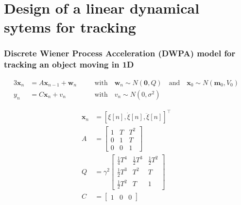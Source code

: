 \section{Design of a linear dynamical sytems for tracking}

\begin{frame}
    \frametitle{Discrete Wiener Process Acceleration (DWPA) model for tracking
    an object moving in 1D}

    \small

    \begin{alignat*}{3}
        \mathbf{x}_n &= A\mathbf{x}_{n-1} + \mathbf{w}_n && \quad \text{with} \quad\mathbf{w}_n\sim N(\mathbf{0}, Q) \quad \text{and} \quad\mathbf{x}_0\sim N(\mathbf{m}_0, V_0)\\
        y_n &= C\mathbf{x}_{n} + v_n                     && \quad \text{with} \quad v_n\sim N(0, \sigma^2)
    \end{alignat*}

    \begin{align*}
        \mathbf{x}_n&=\left[\xi[n],\dot{\xi}[n],\ddot{\xi}[n]\right]^\intercal\\
        A&=\begin{bmatrix}
            1 & T & T^2\\
            0 & 1 & T\\
            0 & 0 & 1
        \end{bmatrix}\\
        Q&=\gamma^2\begin{bmatrix}
            \frac{1}{4}T^4&\frac{1}{2}T^3&\frac{1}{2}T^2\\
            \frac{1}{2}T^3&T^2&T\\
            \frac{1}{2}T^2&T&1
        \end{bmatrix}\\
        C&=\begin{bmatrix}
            1 & 0 &0
        \end{bmatrix}
    \end{align*}

    \normalsize

\end{frame}

